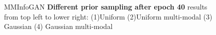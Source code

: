 \documentclass[letterpaper,12pt]{article}
\begin{document}
\begin{figure}[H]
    \hspace{10px}
    \hspace{10px}
    \caption{MMInfoGAN \textbf{Different prior sampling after epoch 40} results from top left to lower right: (1)Uniform (2)Uniform multi-modal (3) Gaussian (4) Gaussian multi-modal}
\end{figure}
\end{document}
